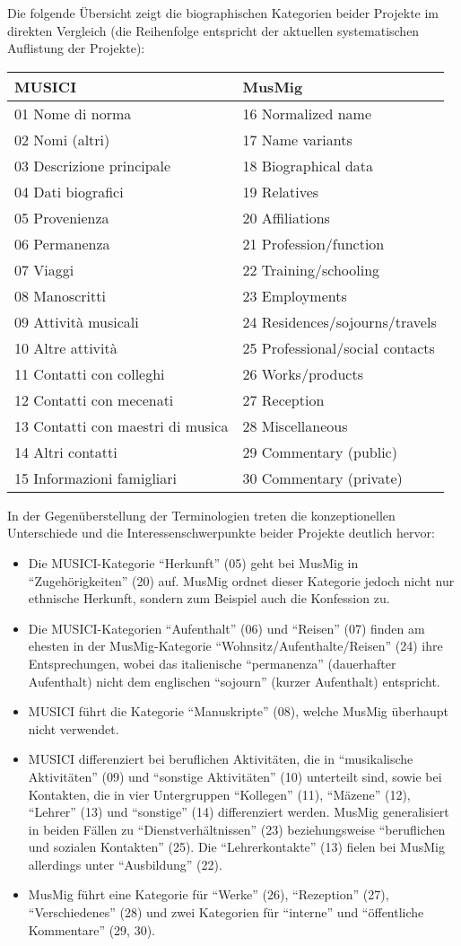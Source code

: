 \documentclass[a4paper,
fontsize=11pt,
oneside,
numbers=noperiodatend,
parskip=half-,
bibliography=totoc,
final
]{scrartcl}
\begin{document}
Die folgende Übersicht zeigt die biographischen Kategorien beider
Projekte im direkten Vergleich (die Reihenfolge entspricht der aktuellen
systematischen Auflistung der Projekte):

\begin{longtable}[]{@{}ll@{}}
\toprule
\textbf{MUSICI} & \textbf{MusMig}\tabularnewline
\midrule
\endhead
01 Nome di norma & 16 Normalized name\tabularnewline
02 Nomi (altri) & 17 Name variants\tabularnewline
03 Descrizione principale & 18 Biographical data\tabularnewline
04 Dati biografici & 19 Relatives\tabularnewline
05 Provenienza & 20 Affiliations\tabularnewline
06 Permanenza & 21 Profession/function\tabularnewline
07 Viaggi & 22 Training/schooling\tabularnewline
08 Manoscritti & 23 Employments\tabularnewline
09 Attività musicali & 24 Residences/sojourns/travels\tabularnewline
10 Altre attività & 25 Professional/social contacts\tabularnewline
11 Contatti con colleghi & 26 Works/products\tabularnewline
12 Contatti con mecenati & 27 Reception\tabularnewline
13 Contatti con maestri di musica & 28 Miscellaneous\tabularnewline
14 Altri contatti & 29 Commentary (public)\tabularnewline
15 Informazioni famigliari & 30 Commentary (private)\tabularnewline
\bottomrule
\end{longtable}

In der Gegenüberstellung der Terminologien treten die konzeptionellen
Unterschiede und die Interessenschwerpunkte beider Projekte deutlich
hervor:

\begin{itemize}
\item
  Die MUSICI-Kategorie \enquote{Herkunft} (05) geht bei MusMig in
  \enquote{Zugehörigkeiten} (20) auf. MusMig ordnet dieser Kategorie
  jedoch nicht nur ethnische Herkunft, sondern zum Beispiel auch die
  Konfession zu.
\item
  Die MUSICI-Kategorien \enquote{Aufenthalt} (06) und \enquote{Reisen}
  (07) finden am ehesten in der MusMig-Kategorie
  \enquote{Wohnsitz/Aufenthalte/Reisen} (24) ihre Entsprechungen, wobei
  das italienische \enquote{permanenza} (dauerhafter Aufenthalt) nicht
  dem englischen \enquote{sojourn} (kurzer Aufenthalt) entspricht.
\item
  MUSICI führt die Kategorie \enquote{Manuskripte} (08), welche MusMig
  überhaupt nicht verwendet.
\item
  MUSICI differenziert bei beruflichen Aktivitäten, die in
  \enquote{musikalische Aktivitäten} (09) und \enquote{sonstige
  Aktivitäten} (10) unterteilt sind, sowie bei Kontakten, die in vier
  Untergruppen \enquote{Kollegen} (11), \enquote{Mäzene} (12),
  \enquote{Lehrer} (13) und \enquote{sonstige} (14) differenziert
  werden. MusMig generalisiert in beiden Fällen zu
  \enquote{Dienstverhältnissen} (23) beziehungsweise
  \enquote{beruflichen und sozialen Kontakten} (25). Die
  \enquote{Lehrerkontakte} (13) fielen bei MusMig allerdings unter
  \enquote{Ausbildung} (22).
\item
  MusMig führt eine Kategorie für \enquote{Werke} (26),
  \enquote{Rezeption} (27), \enquote{Verschiedenes} (28) und zwei
  Kategorien für \enquote{interne} und \enquote{öffentliche Kommentare}
  (29, 30).
\end{itemize}
\end{document}
